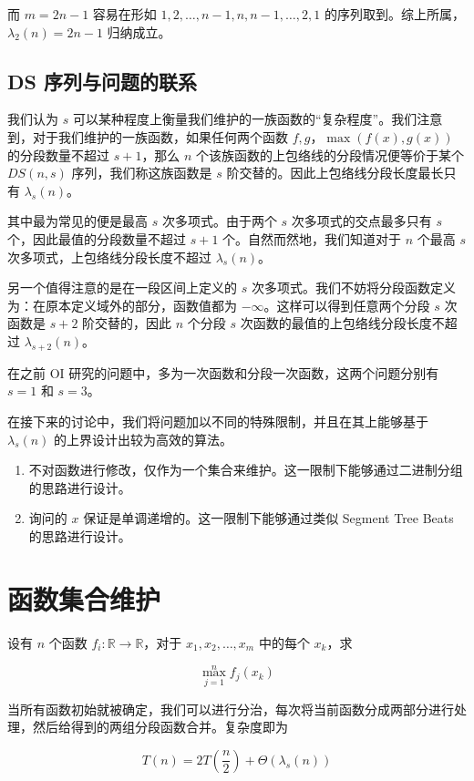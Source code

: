 \documentclass{noithesis}
\begin{document}
而 $m = 2n-1$ 容易在形如 $1, 2, \dots, n - 1, n, n - 1, \dots, 2, 1$ 的序列取到。综上所属，$\lambda_2(n) = 2n-1$ 归纳成立。

\subsection{DS 序列与问题的联系}

我们认为 $s$ 可以某种程度上衡量我们维护的一族函数的“复杂程度”。我们注意到，对于我们维护的一族函数，如果任何两个函数 $f, g$，$\max (f(x), g(x))$ 的分段数量不超过 $s + 1$，那么 $n$ 个该族函数的上包络线的分段情况便等价于某个 $DS(n, s)$ 序列，我们称这族函数是 $s$ 阶交替的。因此上包络线分段长度最长只有 $\lambda_s(n)$。

其中最为常见的便是最高 $s$ 次多项式。由于两个 $s$ 次多项式的交点最多只有 $s$ 个，因此最值的分段数量不超过 $s+1$ 个。自然而然地，我们知道对于 $n$ 个最高 $s$ 次多项式，上包络线分段长度不超过 $\lambda_s(n)$。

另一个值得注意的是在一段区间上定义的 $s$ 次多项式。我们不妨将分段函数定义为：在原本定义域外的部分，函数值都为 $-\infty$。这样可以得到任意两个分段 $s$ 次函数是 $s+2$ 阶交替的，因此 $n$ 个分段 $s$ 次函数的最值的上包络线分段长度不超过 $\lambda_{s+2}(n)$。

在之前 OI 研究的问题中，多为一次函数和分段一次函数，这两个问题分别有 $s=1$ 和 $s=3$。

在接下来的讨论中，我们将问题加以不同的特殊限制，并且在其上能够基于 $\lambda_s(n)$ 的上界设计出较为高效的算法。

\begin{enumerate}
\item 不对函数进行修改，仅作为一个集合来维护。这一限制下能够通过二进制分组的思路进行设计。
\item 询问的 $x$ 保证是单调递增的。这一限制下能够通过类似 Segment Tree Beats 的思路进行设计。
\end{enumerate}

\section{函数集合维护}

设有 $n$ 个函数 $f_i : \mathbb R \rightarrow \mathbb R$，对于 $x_1, x_2, \dots, x_m$ 中的每个 $x_k$，求

$$
\max_{j=1}^n f_j(x_k)
$$

当所有函数初始就被确定，我们可以进行分治，每次将当前函数分成两部分进行处理，然后给得到的两组分段函数合并。复杂度即为

$$
T(n) = 2T \left(\frac n2\right) + \Theta(\lambda_s (n))
$$
\end{document}
